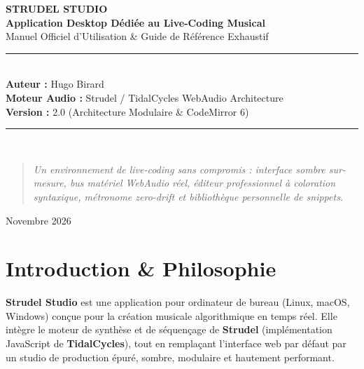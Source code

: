 \documentclass[a4paper,10pt]{article}
\begin{document}
\begin{titlepage}
    \centering
    \vspace*{2cm}
    {\Huge \textbf{\color{primary} STRUDEL STUDIO}}\\[0.5cm]
    {\Large \textbf{Application Desktop Dédiée au Live-Coding Musical}}\\[0.3cm]
    {\large Manuel Officiel d'Utilisation \& Guide de Référence Exhaustif}\\[1.5cm]

    \rule{\linewidth}{0.5mm}\\[0.4cm]
    {\large \textbf{Auteur :}} Hugo Birard\\
    {\large \textbf{Moteur Audio :}} Strudel / TidalCycles WebAudio Architecture\\
    {\large \textbf{Version :}} 2.0 (Architecture Modulaire \& CodeMirror 6)\\[0.4cm]
    \rule{\linewidth}{0.5mm}\\[2cm]

    \begin{quote}
    \centering
    \textit{Un environnement de live-coding sans compromis : interface sombre sur-mesure, bus matériel WebAudio réel, éditeur professionnel à coloration syntaxique, métronome zero-drift et bibliothèque personnelle de snippets.}
    \end{quote}

    \vfill
    {\large Novembre 2026}
\end{titlepage}

\tableofcontents
\newpage

\section{Introduction \& Philosophie}
\textbf{Strudel Studio} est une application pour ordinateur de bureau (Linux, macOS, Windows) conçue pour la création musicale algorithmique en temps réel. Elle intègre le moteur de synthèse et de séquençage de \textbf{Strudel} (implémentation JavaScript de \textbf{TidalCycles}), tout en remplaçant l'interface web par défaut par un studio de production épuré, sombre, modulaire et hautement performant.
\end{document}
